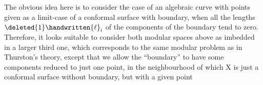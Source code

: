 The obvious idea here is to consider the case of an algebraic curve with \handwritten{$\nu$} points given as a limit-case of a  conformal surface with boundary, when all the lengths $\deleted{1}\handwritten{\ell}_{\mathrm i}$ of the components of the boundary tend to zero. Therefore, it looks suitable to consider both modular spaces above as imbedded in a larger third one, which corresponds to the same modular problem as in Thurston's theory, except that we allow the ``boundary'' to have some components reduced to just one point, in the neighbourhood of which X is just a conformal surface without boundary, but with a given point
